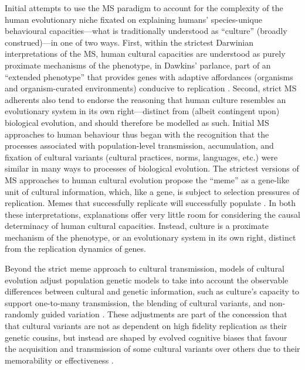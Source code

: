 Initial attempts to use the MS paradigm to account for the complexity of the human evolutionary niche fixated on explaining humans' species-unique behavioural capacities---what is traditionally understood as ``culture'' (broadly construed)---in one of two ways.  First, within the strictest Darwinian interpretations of the MS, human cultural capacities are understood as purely proximate mechanisms of the phenotype, in Dawkins' parlance, part of an ``extended phenotype'' that provides genes with adaptive affordances (organisms and organism-curated environments) conducive to replication \citep{Dawkins1982}. Second, strict MS adherents also tend to endorse the reasoning that human culture resembles an evolutionary system in its own right---distinct from (albeit contingent upon) biological evolution, and should therefore be modelled as such.  Initial MS approaches to human behaviour thus began with the recognition that the processes associated with population-level transmission, accumulation, and fixation of cultural variants (cultural practices, norms, languages, etc.) were similar in many ways to processes of biological evolution. The strictest versions of MS approaches to human cultural evolution propose the ``meme'' as a gene-like unit of cultural information, which, like a gene, is subject to selection pressures of replication.  Memes that successfully replicate will successfully populate \citep{Dawkins1976}.  In both these interpretations, explanations offer very little room for considering the causal determinacy of human cultural capacities.  Instead, culture is a proximate mechanism of the phenotype, or an evolutionary system in its own right, distinct from the replication dynamics of genes.

Beyond the strict meme approach to cultural transmission, models of cultural evolution adjust population genetic models to take into account the observable differences between cultural and genetic information, such as culture's capacity to support one-to-many transmission, the blending of cultural variants, and non-randomly guided variation \citep{Cavalli-Sforza1981,Boyd1988}.  These adjustments are part of the concession that that cultural variants are not as dependent on high fidelity replication as their genetic cousins, but instead are shaped by evolved cognitive biases that favour the acquisition and transmission of some cultural variants over others due to their memorability or effectiveness \citep{Henrich2007}.

